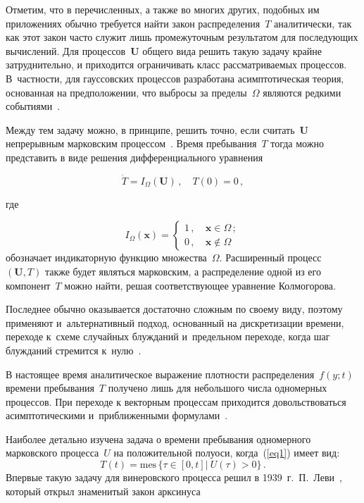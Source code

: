 \begin{multicols}{2}
Отметим, что в перечисленных, а также во многих других, подобных им приложениях обычно требуется найти закон распределения~$T$ аналитически, так как этот закон часто служит лишь промежуточным результатом для последующих вычислений. Для процессов~$\mathbf{U}$ общего вида решить такую задачу крайне затруднительно, и приходится ограничивать класс рассматриваемых процессов. В~частности, для гауссовских процессов разработана асимптотическая теория, основанная на предположении, что выбросы за пределы~$\Omega$ являются редкими событиями~\cite{ref3}.

Между тем задачу можно, в принципе, решить точно, если считать~$\mathbf{U}$ непрерывным марковским процессом~\cite{ref4}. Время пребывания~$T$ тогда можно представить в виде решения дифференциального уравнения

\vspace*{2pt}

\noindent
\begin{equation}
  \label{eq2-b}
  \dot T = I_\Omega (\mathbf{U})\,,\quad T(0)=0\,,
\end{equation}

\vspace*{-2pt}

\noindent
где

\noindent
\begin{equation*}
  I_\Omega(\mathbf{x}) =
  \begin{cases}
  1\,, &\ \mathbf{x} \in \Omega\,;\\
  0\,, &\ \mathbf{x} \notin \Omega
\end{cases}
\end{equation*}
обозначает индикаторную функцию множества~$\Omega$. Расширенный процесс~$(\mathbf{U}, T)$ также будет являться марковским, а распределение одной из его компонент~$T$ можно найти, решая соответствующее уравнение Колмогорова.

Последнее обычно оказывается достаточно сложным по своему виду, поэтому применяют и~альтернативный подход, основанный на дискретизации времени, переходе к~схеме случайных блуж\-да\-ний и~предельном переходе, когда шаг блужданий стремится к~нулю~\cite{ref5}.

В настоящее время аналитическое выражение плотности распределения~$f(y; t)$ времени пребывания~$T$ получено лишь для небольшого числа одномерных процессов. При переходе к векторным процессам приходится довольствоваться асимптотическими
и~приближенными формулами~\cite{ref6}.

Наиболее детально изучена задача о времени пребывания одномерного марковского процесса~$U$ на положительной полуоси, когда~(\ref{eq1}) имеет вид:
\begin{equation}
  \label{eq3-b}
  T(t)=\mathrm{mes}\, \{ \tau \in [0, t]|\ U(\tau)>0 \}\,.
\end{equation}
Впервые такую задачу для винеровского процесса решил в 1939~г.\ П.~Леви~\cite{ref7}, который открыл знаменитый закон арксинуса


\end{multicols}
